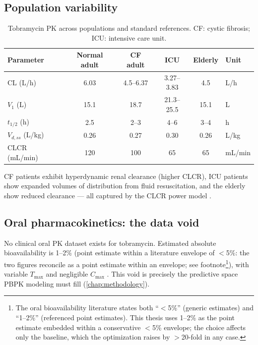 \subsection{Population variability}
\begin{table}[htbp]
\centering
\caption{Tobramycin PK across populations \citep{Li2021} and standard references. CF: cystic fibrosis; ICU: intensive care unit.}
\label{tab:pk-populations}
\begin{tabular}{lccccl}
\toprule
Parameter & Normal adult & CF adult & ICU & Elderly & Unit\\
\midrule
CL (L/h)       & 6.03 & 4.5--6.37 & 3.27--3.83 & 4.5 & L/h\\
$V_1$ (L)      & 15.1 & 18.7      & 21.3--25.5 & 15.1 & L\\
$t_{1/2}$ (h)  & 2.5  & 2--3      & 4--6       & 3--4 & h\\
$V_{d,ss}$ (L/kg) & 0.26 & 0.27   & 0.30       & 0.26 & L/kg\\
CLCR (mL/min)  & 120  & 100       & 65         & 65   & mL/min\\
\bottomrule
\end{tabular}
\end{table}

CF patients exhibit hyperdynamic renal clearance (higher CLCR), ICU patients show expanded volumes of distribution from fluid resuscitation, and the elderly show reduced clearance --- all captured by the CLCR power model \citep{Li2021, Struiken2024}.

\subsection{Oral pharmacokinetics: the data void}
No clinical oral PK dataset exists for tobramycin. Estimated absolute bioavailability is 1--2\% (point estimate within a literature envelope of $<$5\%: the two figures reconcile as a point estimate within an envelope; see footnote\footnote{The oral bioavailability literature states both ``$<$5\%'' (generic estimates) and ``1--2\%'' (referenced point estimates). This thesis uses 1--2\% as the point estimate embedded within a conservative $<$5\% envelope; the choice affects only the baseline, which the optimization raises by $>$20-fold in any case.}), with variable $T_{\max}$ and negligible $C_{\max}$ \citep{Asad2023}. This void is precisely the predictive space PBPK modeling must fill (\cref{chap:methodology}).

